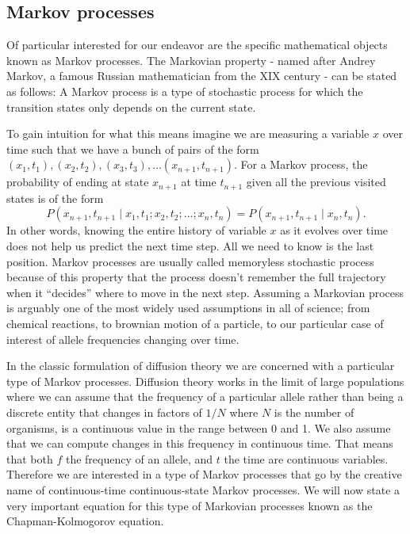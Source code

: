 \subsection{Markov processes}
Of particular interested for our endeavor are the specific mathematical objects
known as Markov processes. The Markovian property - named after Andrey Markov,
a famous Russian mathematician from the XIX century - can be stated as follows:
A Markov process is a type of stochastic process for which the transition
states only depends on the current state.

To gain intuition for what this means imagine we are measuring a variable $x$
over time such that we have a bunch of pairs of the form $(x_1, t_1), (x_2,
t_2), (x_3, t_3), \ldots (x_{n+1}, t_{n+1})$. For a Markov process, the
probability of ending at state $x_{n+1}$ at time $t_{n+1}$ given all the
previous visited states is of the form
\begin{equation}
  P(x_{n+1}, t_{n+1} \mid x_1, t_1; x_2, t_2; \ldots; x_n, t_n) =
  P(x_{n+1}, t_{n+1} \mid x_n, t_n).
  \label{eq_chapman_kolmogorov}
\end{equation}
In other words, knowing the entire history of variable $x$ as it evolves over
time does not help us predict the next time step. All we need to know is the
last position. Markov processes are usually called memoryless stochastic
process because of this property that the process doesn't remember the full
trajectory when it ``decides'' where to move in the next step. Assuming a
Markovian process is arguably one of the most widely used assumptions in all of
science; from chemical reactions, to brownian motion of a particle, to our
particular case of interest of allele frequencies changing over time.

In the classic formulation of diffusion theory we are concerned with a
particular type of Markov processes. Diffusion theory works in the limit of
large populations where we can assume that the frequency of a particular allele
rather than being a discrete entity that changes in factors of $1 / N$ where
$N$ is the number of organisms, is a continuous value in the range between 0
and 1. We also assume that we can compute changes in this frequency in
continuous time. That means that both $f$ the frequency of an allele, and $t$
the time are continuous variables. Therefore we are interested in a type of
Markov processes that go by the creative name of continuous-time
continuous-state Markov processes. We will now state a very important equation
for this type of Markovian processes known as the Chapman-Kolmogorov equation.

